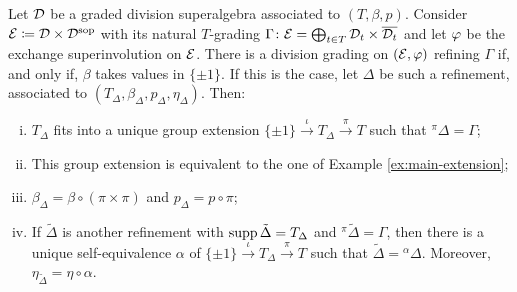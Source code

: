 \begin{thm}\label{thm:refinement-DxDsop}
	Let $\mathcal{D}$ be a graded division superalgebra associated to $(T, \beta, p)$.
	Consider $\mathcal E \coloneqq \mathcal{D} \times \mathcal{D}^{\mathrm{sop}}$ with its natural $T$-grading $\Gamma\colon \mathcal E = \bigoplus_{t\in T} \mathcal{D}_t \times \overline{\mathcal{D}_t}$ and let $\varphi$ be the exchange superinvolution on $\mathcal E$.
	There is a division grading on $(\mathcal E, \varphi)$ refining $\Gamma$ if, and only if, $\beta$ takes values in $\{ \pm 1 \}$.
	If this is the case, let $\Delta$ be such a refinement, associated to $(T_\Delta, \beta_\Delta, p_\Delta, \eta_\Delta)$.
	Then: %
	\begin{enumerate}[(i)]

		\item %
		      $T_\Delta$ fits into a unique group extension $\{ \pm 1 \} \xrightarrow{\iota} T_\Delta \xrightarrow{\pi} T$ such that ${}^{\pi} \Delta = \Gamma$; \label{item:there-is-extension}

		\item This group extension is equivalent to the one of Example \ref{ex:main-extension}; \label{item:equivalent-extension-example}
		\item $\beta_\Delta = \beta \circ (\pi \times \pi)$ and $p_\Delta = p \circ \pi$; \label{item:beta-and-p-delta}
		\item If $\tilde \Delta$ is another refinement with $\operatorname{supp} \tilde \Delta = T_\Delta$ and ${}^\pi \tilde \Delta = \Gamma$, then there is a unique self-equivalence $\alpha$ of $\{ \pm 1 \} \xrightarrow{\iota} T_\Delta \xrightarrow{\pi} T$ such that $\tilde \Delta = {}^\alpha \Delta$.
		      Moreover, $\eta_{\tilde \Delta} = \eta \circ \alpha$. \label{item:number-of-extensions}
	\end{enumerate}

\end{thm}

